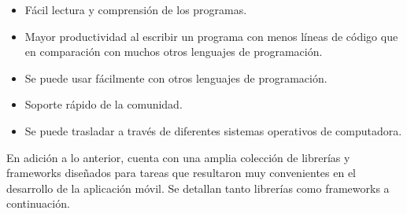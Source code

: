 \begin{itemize}
	\item Fácil lectura y comprensión de los programas.
	\item Mayor productividad al escribir un programa con menos líneas de código que en comparación con muchos otros lenguajes de programación.
	\item Se puede usar fácilmente con otros lenguajes de programación.
	\item Soporte rápido de la comunidad.
	\item Se puede trasladar a través de diferentes sistemas operativos de computadora.
\end{itemize}

En adición a lo anterior, cuenta con una amplia colección de librerías y frameworks diseñados para tareas que resultaron muy convenientes en el desarrollo de la aplicación móvil. Se detallan tanto librerías como frameworks a continuación.


